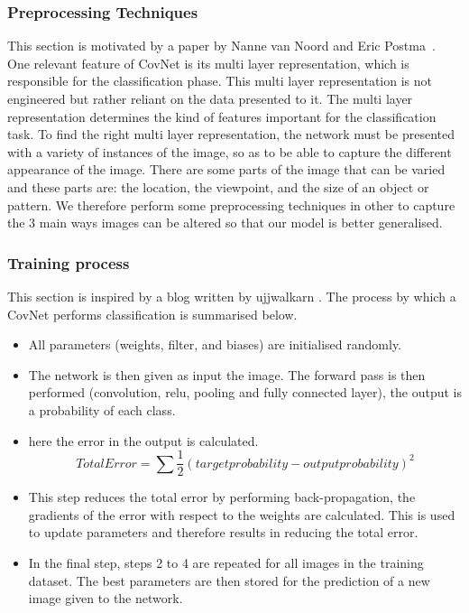 \documentclass[12pt, a4paper,oneside]{report}
\begin{document}
\subsubsection{Preprocessing Techniques}
This section is motivated by a paper by Nanne van Noord and Eric Postma~\cite{van2017learning}. One relevant feature of CovNet is its multi layer representation, which is responsible for the classification phase. This multi layer representation is not engineered but rather reliant on the data presented to it.
The multi layer representation determines the kind of features important for the classification task. To find the right multi layer representation, the network must be presented with a variety of instances of the image, so as to be able to capture the different appearance of the image. There are some parts of the image that can be varied and these parts are: the location, the viewpoint, and the size of an object or pattern. We therefore perform some preprocessing techniques in other to capture the 3 main ways images can be altered so that our model is better generalised.



\subsubsection{Training process}
This section is inspired by a blog written by ujjwalkarn \cite{cnnonline}. The process by which a CovNet performs classification is summarised below.

\begin{itemize}
	\item All parameters (weights, filter, and biases) are initialised randomly.
	\item The network is then given as input the image. The forward pass is then performed (convolution, relu, pooling and fully connected layer),  the output is a probability of each class.
	\item here the error in the output is calculated.
	\[Total Error = \sum  \frac{1}{2} (target probability - output probability) ^2 \]
	\item This step reduces the total error by performing back-propagation, the gradients of the error with respect to the weights are calculated. This is used to update parameters and therefore results in reducing the total error.
	\item In the final step, steps 2 to 4 are repeated for all images in the training dataset. The best parameters are then stored for the prediction of a new image given to the network.\newline 
	
\end{itemize} 
\end{document}
